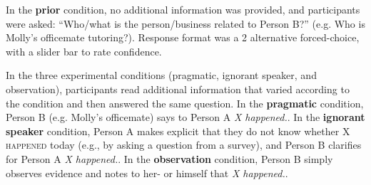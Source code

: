 \documentclass[10pt,letterpaper]{article}
\begin{document}
In the \textbf{prior} condition, no additional information was provided, and participants were asked: ``Who/what is the person/business related to Person B?'' (e.g. Who is Molly's officemate tutoring?).  Response format was a 2 alternative forced-choice, with a slider bar to rate confidence.

In the three experimental conditions (pragmatic, ignorant speaker, and observation), participants read additional information that varied according to the condition and then answered the same question.
In the \textbf{pragmatic} condition,  Person B (e.g. Molly's officemate) says to Person A \emph{X happened.}. 
In the \textbf{ignorant speaker} condition, Person A makes explicit that they do not know whether \textsc{X happened} today (e.g., by asking a question from a survey), and Person B clarifies for Person A \emph{X happened.}.
In the \textbf{observation} condition, Person B simply observes evidence and notes to her- or himself that \emph{X happened.}.
\end{document}
